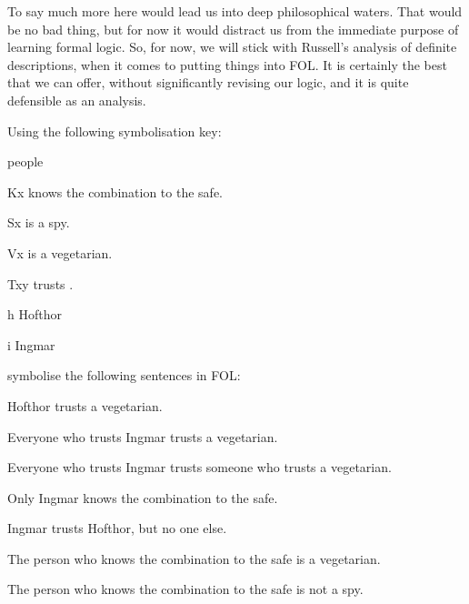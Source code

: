 To say much more here would lead us into deep philosophical waters. That would be no bad thing, but for now it would distract us from the immediate purpose of learning formal logic. So, for now, we will stick with Russell's analysis of definite descriptions, when it comes to putting things into FOL. It is certainly the best that we can offer, without significantly revising our logic, and it is quite defensible as an analysis. 

\practiceproblems

\problempart
Using the following symbolisation key:
\begin{ekey}
\item[\text{domain}] people
\item[Kx]  knows the combination to the safe.
\item[Sx]  is a spy.
\item[Vx]  is a vegetarian.
\item[Txy]  trusts .
\item[h] Hofthor
\item[i] Ingmar
\end{ekey}
symbolise the following sentences in FOL:
\begin{earg}
\item Hofthor trusts a vegetarian.
\item Everyone who trusts Ingmar trusts a vegetarian.
\item Everyone who trusts Ingmar trusts someone who trusts a vegetarian.
\item Only Ingmar knows the combination to the safe.
\item Ingmar trusts Hofthor, but no one else.
\item The person who knows the combination to the safe is a vegetarian.
\item The person who knows the combination to the safe is not a spy.
\end{earg}


